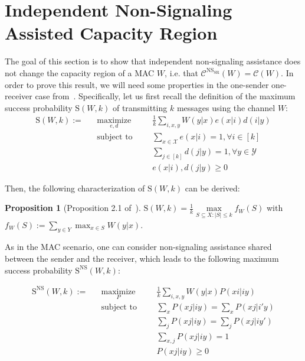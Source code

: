 \documentclass[11pt]{article}
\theoremstyle{definition}
\newtheorem{prop}[theo]{Proposition}
\theoremstyle{remark}
\DeclareMathOperator{\maxi}{\text{maximize}}
\DeclareMathOperator{\st}{\text{subject to}}
\begin{document}
  \section{Independent Non-Signaling Assisted Capacity Region}
  \label{section:NSsr}
The goal of this section is to show that independent non-signaling assistance does not change the capacity region of a MAC $W$, i.e. that $\mathcal{C}^{\mathrm{NS}_{\mathrm{SR}}}(W)=\mathcal{C}(W)$. In order to prove this result, we will need some properties in the one-sender one-receiver case from~\cite{BF18}. Specifically, let us first recall the definition of the maximum success probability $\mathrm{S}(W,k)$ of transmitting $k$ messages using the channel $W$:
\begin{equation}
  \begin{aligned}
    \mathrm{S}(W,k) := &&\underset{e,d}{\maxi} &&& \frac{1}{k} \sum_{i,x,y} W(y|x)e(x|i)d(i|y)\\
    &&\st &&& \sum_{x \in \mathcal{X}} e(x|i) = 1, \forall i \in [k]\\
    &&&&& \sum_{j \in [k]} d(j|y) = 1, \forall y \in \mathcal{Y}\\
    &&&&& e(x|i), d(j|y) \geq 0
  \end{aligned}
\end{equation}

Then, the following characterization of $\mathrm{S}(W,k)$ can be derived:

\begin{prop}[Proposition 2.1 of~\cite{BF18}]
  $\mathrm{S}(W,k) = \frac{1}{k} \underset{S \subseteq X: |S| \leq k}{\max} f_W(S)$ with $f_W(S) := \sum_{y \in Y} \max_{x \in S} W(y|x)$.
\end{prop}

As in the MAC scenario, one can consider non-signaling assistance shared between the sender and the receiver, which leads to the following maximum success probability $\mathrm{S}^{\mathrm{NS}}(W,k)$:

\begin{equation}
  \begin{aligned}
    \mathrm{S}^{\mathrm{NS}}(W,k) := &&\underset{P}{\maxi} &&& \frac{1}{k} \sum_{i,x,y} W(y|x)P(xi|iy)\\
    &&\st &&& \sum_{x} P(xj|iy) = \sum_{x} P(xj|i'y)\\
    &&&&& \sum_{j} P(xj|iy) = \sum_{j} P(xj|iy')\\
    &&&&& \sum_{x,j} P(xj|iy) = 1\\
    &&&&& P(xj|iy) \geq 0
  \end{aligned}
\end{equation}
\end{document}
